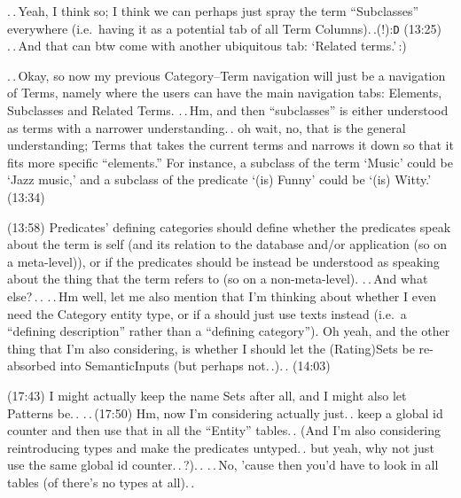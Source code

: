 \documentclass{report}
\begin{document}
.\,.\,Yeah, I think so; I think we can perhaps just spray the term ``Subclasses'' everywhere (i.e.\ having it as a potential tab of all Term Columns).\,.(!):\texttt{D} (13:25) .\,.\,And that can btw come with another ubiquitous tab: `Related terms.'\,:) 

.\,.\,Okay, so now my previous Category--Term navigation will just be a navigation of Terms, namely where the users can have the main navigation tabs: Elements, Subclasses and Related Terms. .\,.\,Hm, and then ``subclasses'' is either understood as terms with a narrower understanding.\,. oh wait, no, that is the general understanding; Terms that takes the current terms and narrows it down so that it fits more specific ``elements.'' For instance, a subclass of the term `Music' could be `Jazz music,' and a subclass of the predicate `(is) Funny' could be `(is) Witty.' (13:34)


(13:58) Predicates' defining categories should define whether the predicates speak about the term is self (and its relation to the database and/or application (so on a meta-level)), or if the predicates should be instead be understood as speaking about the thing that the term refers to (so on a non-meta-level). .\,.\,And what else?\,.\,. .\,.\,Hm well, let me also mention that I'm thinking about whether I even need the Category entity type, or if a should just use texts instead (i.e.\ a ``defining description'' rather than a ``defining category''). Oh yeah, and the other thing that I'm also considering, is whether I should let the (Rating)Sets be re-absorbed into SemanticInputs (but perhaps not.\,.).\,. (14:03)

(17:43) I might actually keep the name Sets after all, and I might also let Patterns be.\,. .\,.\,(17:50) Hm, now I'm considering actually just.\,. keep a global id counter and then use that in all the ``Entity'' tables.\,. (And I'm also considering reintroducing types and make the predicates untyped.\,. but yeah, why not just use the same global id counter.\,.\,?).\,. .\,.\,No, 'cause then you'd have to look in all tables (of there's no types at all).\,. 
\end{document}
